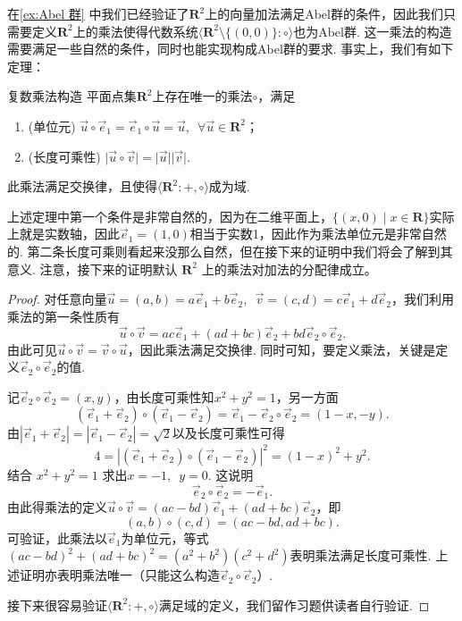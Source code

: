 在\autoref{ex:Abel 群} 中我们已经验证了$\mathbf{R}^2$上的向量加法满足Abel群的条件，因此我们只需要定义$\mathbf{R}^2$上的乘法使得代数系统$\langle\mathbf{R}^2\setminus\{(0,0)\}\colon\circ\rangle$也为Abel群. 这一乘法的构造需要满足一些自然的条件，同时也能实现构成Abel群的要求. 事实上，我们有如下定理：
\begin{theorem}{}{复数乘法构造}
    平面点集$\mathbf{R}^2$上存在唯一的乘法$\circ$，满足
    \begin{enumerate}
        \item (单位元) $\vec{u}\circ\vec{e}_1=\vec{e}_1\circ\vec{u}=\vec{u},\enspace\forall\vec{u}\in\mathbf{R}^2$；

        \item (长度可乘性) $\lvert\vec{u}\circ\vec{v}\rvert=\lvert\vec{u}\rvert\lvert\vec{v}\rvert$.
    \end{enumerate}
    此乘法满足交换律，且使得$\langle\mathbf{R}^2\colon+,\circ\rangle$成为域.
\end{theorem}

上述定理中第一个条件是非常自然的，因为在二维平面上，$\{(x,0) \mid x\in\mathbf{R}\}$实际上就是实数轴，因此$\vec{e}_1=(1,0)$相当于实数1，因此作为乘法单位元是非常自然的. 第二条长度可乘则看起来没那么自然，但在接下来的证明中我们将会了解到其意义. 注意，接下来的证明默认 $\mathbf{R}^2$ 上的乘法对加法的分配律成立。

\begin{proof}
    对任意向量$\vec{u}=(a,b)=a\vec{e}_1+b\vec{e}_2,\enspace \vec{v}=(c,d)=c\vec{e}_1+d\vec{e}_2$，我们利用乘法的第一条性质有
    \[\vec{u}\circ\vec{v}=ac\vec{e}_1+(ad+bc)\vec{e}_2+bd\vec{e}_2\circ\vec{e}_2.\]
    由此可见$\vec{u}\circ\vec{v}=\vec{v}\circ\vec{u}$，因此乘法满足交换律. 同时可知，要定义乘法，关键是定义$\vec{e}_2\circ\vec{e}_2$的值.

    记$\vec{e}_2\circ\vec{e}_2=(x,y)$，由长度可乘性知$x^2+y^2=1$，另一方面
    \[(\vec{e}_1+\vec{e}_2)\circ(\vec{e}_1-\vec{e}_2)=\vec{e}_1-\vec{e}_2\circ\vec{e}_2=(1-x,-y).\]
    由$|\vec{e}_1+\vec{e}_2|=|\vec{e}_1-\vec{e}_2|=\sqrt{2}$以及长度可乘性可得
    \[4=|(\vec{e}_1+\vec{e}_2)\circ(\vec{e}_1-\vec{e}_2)|^2=(1-x)^2+y^2.\]
    结合 $x^2+y^2=1$ 求出$x=-1,\enspace y=0$. 这说明
    \[\vec{e}_2\circ\vec{e}_2=-\vec{e}_1.\]
    由此得乘法的定义$\vec{u}\circ\vec{v}=(ac-bd)\vec{e}_1+(ad+bc)\vec{e}_2$，即
    \[(a,b)\circ(c,d)=(ac-bd,ad+bc).\]
    可验证，此乘法以$\vec{e}_1$为单位元，等式$(ac-bd)^2+(ad+bc)^2=(a^2+b^2)(c^2+d^2)$表明乘法满足长度可乘性. 上述证明亦表明乘法唯一（只能这么构造$\vec{e}_2\circ\vec{e}_2$）.

    接下来很容易验证$\langle\mathbf{R}^2\colon+,\circ\rangle$满足域的定义，我们留作习题供读者自行验证.
\end{proof}

